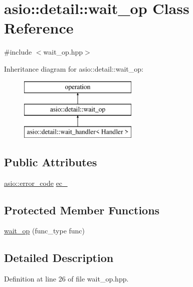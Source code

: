 \hypertarget{classasio_1_1detail_1_1wait__op}{}\section{asio\+:\+:detail\+:\+:wait\+\_\+op Class Reference}
\label{classasio_1_1detail_1_1wait__op}


{\ttfamily \#include $<$wait\+\_\+op.\+hpp$>$}

Inheritance diagram for asio\+:\+:detail\+:\+:wait\+\_\+op\+:\begin{figure}[H]
\begin{center}
\leavevmode
\includegraphics[height=3.000000cm]{classasio_1_1detail_1_1wait__op}
\end{center}
\end{figure}
\subsection*{Public Attributes}
\begin{DoxyCompactItemize}
\item 
\hyperlink{classasio_1_1error__code}{asio\+::error\+\_\+code} \hyperlink{classasio_1_1detail_1_1wait__op_a6f4814b62739333a69c3863f76e1b0d1}{ec\+\_\+}
\end{DoxyCompactItemize}
\subsection*{Protected Member Functions}
\begin{DoxyCompactItemize}
\item 
\hyperlink{classasio_1_1detail_1_1wait__op_a7418081bc1334183532fee12126d9ced}{wait\+\_\+op} (func\+\_\+type func)
\end{DoxyCompactItemize}


\subsection{Detailed Description}


Definition at line 26 of file wait\+\_\+op.\+hpp.




